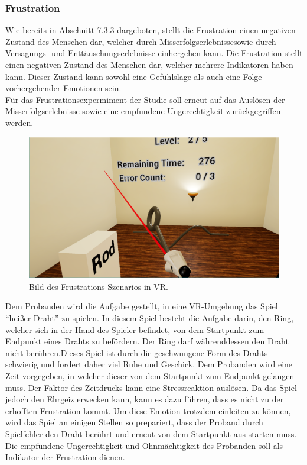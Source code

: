 \subsubsection{Frustration} \label{frust-4}




Wie bereits in Abschnitt 7.3.3 dargeboten, stellt die Frustration einen negativen Zustand des Menschen dar, welcher durch Misserfolgserlebnissesowie durch Versagungs- und Entt{\"a}uschungserlebnisse einhergehen kann. Die Frustration stellt einen negativen Zustand des Menschen dar, welcher mehrere Indikatoren haben kann. Dieser Zustand kann sowohl eine Gef{\"u}hlslage als auch eine Folge vorhergehender Emotionen sein. \\

F{\"u}r das Frustrationsexpermiment der Studie soll erneut auf das Ausl{\"o}sen der Misserfolgserlebnisse sowie eine empfundene Ungerechtigkeit zur{\"u}ckgegriffen werden. \\



\begin{figure}[H] \centering
\includegraphics[width=\textwidth]{Images/frust4.png} 
\caption{ Bild des Frustrations-Szenarios in VR. }
\label{fig:frust4} 
\end{figure}




Dem Probanden wird die Aufgabe gestellt, in eine VR-Umgebung das Spiel ``hei{\ss}er Draht'' zu spielen. In diesem Spiel besteht die Aufgabe darin, den Ring, welcher sich in der Hand des Spieler befindet, von dem Startpunkt zum Endpunkt eines Drahts zu bef{\"o}rdern. Der Ring darf w{\"a}hrenddessen den Draht nicht ber{\"u}hren.Dieses Spiel ist durch die geschwungene Form des Drahts schwierig und fordert daher viel Ruhe und Geschick. Dem Probanden wird eine Zeit vorgegeben, in welcher dieser von dem Startpunkt zum Endpunkt gelangen muss. Der Faktor des Zeitdrucks kann eine Stressreaktion ausl{\"o}sen. Da das Spiel jedoch den Ehrgeiz erwecken kann, kann es dazu f{\"u}hren, dass es nicht zu der erhofften Frustration kommt. Um diese Emotion trotzdem einleiten zu k{\"o}nnen, wird das Spiel an einigen Stellen so prepariert, dass der Proband durch Spielfehler den Draht ber{\"u}hrt und erneut von dem Startpunkt aus starten muss. Die empfundene Ungerechtigkeit und Ohnm{\"a}chtigkeit des Probanden soll als Indikator der Frustration dienen.
